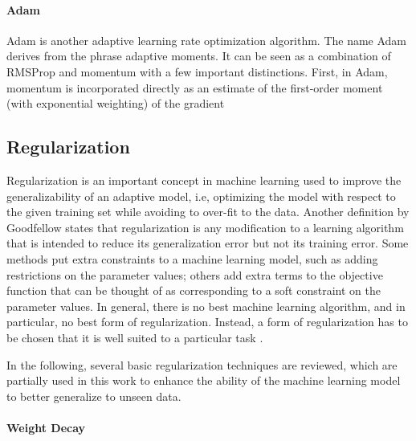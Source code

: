 \documentclass{scrartcl}
\begin{document}
\paragraph{Adam}

Adam \cite{Kingma2014} is another adaptive learning rate optimization algorithm. The name Adam derives from the phrase adaptive moments. It can be seen as a combination of RMSProp and momentum with a few important distinctions. First, in Adam, momentum is incorporated directly as an estimate of the first-order moment (with exponential weighting) of the gradient  






\subsection{Regularization}

Regularization is an important concept in machine learning used to improve the generalizability of an adaptive model, i.e, optimizing the model with respect to the given training set while avoiding to over-fit to the data. Another definition by Goodfellow \cite{Goodfellow2016} states that regularization is any modification to a learning algorithm that is intended to reduce its generalization error but not its training error. Some methods put extra constraints to a machine learning model, such as adding restrictions on the parameter values; others add extra terms to the objective function that can be thought of as corresponding to a soft constraint on the parameter values. In general, there is no best machine learning algorithm, and in particular, no best form of regularization. Instead, a form of regularization has to be chosen that it is well suited to a particular task \cite{Wolpert1996}.


In the following, several basic regularization techniques are reviewed, which are partially used in this work to enhance the ability of the machine learning model to better generalize to unseen data.




\paragraph{Weight Decay}
\end{document}
